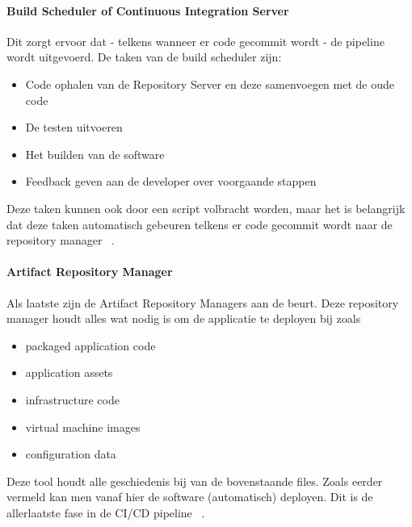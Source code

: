     \paragraph{Build Scheduler of Continuous Integration Server}
    Dit zorgt ervoor dat - telkens wanneer er code gecommit wordt - de pipeline wordt uitgevoerd. De taken van de build scheduler zijn: 
    \begin{itemize}
        \item Code ophalen van de Repository Server en deze samenvoegen met de oude code
        \item De testen uitvoeren
        \item Het builden van de software
        \item Feedback geven aan de developer over voorgaande stappen
    \end{itemize}
    Deze taken kunnen ook door een script volbracht worden, maar het is belangrijk dat deze taken automatisch gebeuren telkens er code gecommit wordt naar de repository manager ~\autocite{Riti2018}.
    
    \paragraph{Artifact Repository Manager}
    Als laatste zijn de Artifact Repository Managers aan de beurt. Deze repository manager houdt alles wat nodig is om de applicatie te deployen bij zoals
    \begin{itemize}
        \item packaged application code
        \item application assets
        \item infrastructure code
        \item virtual machine images
        \item configuration data
    \end{itemize}
    Deze tool houdt alle geschiedenis bij van de bovenstaande files. Zoals eerder vermeld kan men vanaf hier de software (automatisch) deployen. Dit is de allerlaatste fase in de CI/CD pipeline ~\autocite{Skelton2014}.
    
